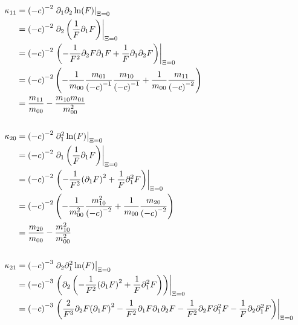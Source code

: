 \documentclass{article}
\begin{document}
\begin{align*}
  \phantom{\kappa_{00}}
  &\begin{aligned}
  \nonumber
    \mathllap{\kappa_{11}} & = {(-c)}^{-2} \left.\partial_1 \partial_2 \ln(F) \right|_{\Xi = 0} \\
    & = {(-c)}^{-2} \left.\partial_2 \left( \frac{1}{F} \partial_1 F \right) \right|_{\Xi = 0} \\
    & = {(-c)}^{-2} \left.\left( -\frac{1}{F^2} \partial_2 F \partial_1 F + \frac{1}{F} \partial_1\partial_2 F \right) \right|_{\Xi = 0} \\
    & = {(-c)}^{-2} \left(
      - \frac{1}{m_{00}} \frac{m_{01}}{{(-c)}^{-1}} \frac{m_{10}}{{(-c)}^{-1}}
      + \frac{1}{m_{00}} \frac{m_{11}}{{(-c)}^{-2}}
      \right) \\
    & = \frac{m_{11}}{m_{00}} - \frac{m_{10}m_{01}}{m_{00}^2}
  \end{aligned} \\
  \\
  &\begin{aligned}
  \nonumber
  \mathllap{\kappa_{20}} & = {(-c)}^{-2} \left.\partial_1^2 \ln(F) \right|_{\Xi = 0} \\
  & = {(-c)}^{-2} \left.\partial_1 \left( \frac{1}{F} \partial_1 F \right) \right|_{\Xi = 0} \\
  & = {(-c)}^{-2} \left.\left( -\frac{1}{F^2} {(\partial_1 F)}^2 + \frac{1}{F} \partial_1^2 F \right) \right|_{\Xi = 0} \\
  & = {(-c)}^{-2} \left(
    - \frac{1}{m_{00}^2} \frac{m_{10}^2}{{(-c)}^{-2}}
    + \frac{1}{m_{00}} \frac{m_{20}}{{(-c)}^{-2}}
    \right)\\
  & = \frac{m_{20}}{m_{00}} - \frac{m_{10}^2}{m_{00}^2}
  \end{aligned} \\
  \\
  &\begin{aligned}
  \nonumber
  \mathllap{\kappa_{21}} & = {(-c)}^{-3} \left. \partial_2 \partial_1^2 \ln(F) \right|_{\Xi = 0} \\
  & = {(-c)}^{-3} \left.\left(\partial_2\left( -\frac{1}{F^2} {(\partial_1 F)}^2 + \frac{1}{F} \partial_1^2 F \right)\right) \right|_{\Xi = 0} \\
  & = {(-c)}^{-3} \left.\left(
      \frac{2}{F^3} \partial_2 F {(\partial_1 F)}^2
    - \frac{1}{F^2} \partial_1 F \partial_1 \partial_2 F
    - \frac{1}{F^2} \partial_2 F \partial_1^2 F
    - \frac{1}{F} \partial_2 \partial_1^2 F
    \right)\right|_{\Xi = 0}\\

\end{aligned}
\end{align*}
\end{document}
